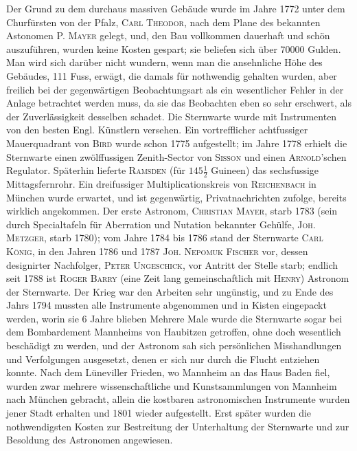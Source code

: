 Der Grund zu dem durchaus massiven Gebäude wurde im Jahre 1772 unter dem Churfürsten von der Pfalz, \textsc{Carl Theodor}, nach dem Plane des bekannten Astonomen P. \textsc{Mayer} gelegt, und, den Bau vollkommen dauerhaft und schön auszuführen, wurden keine Kosten gespart; sie beliefen sich über 70000 Gulden. Man wird sich darüber nicht wundern, wenn man die ansehnliche Höhe des Gebäudes, 111 Fuss, erwägt, die damals für nothwendig gehalten wurden, aber freilich bei der gegenwärtigen Beobachtungsart als ein wesentlicher Fehler in der Anlage betrachtet werden muss, da sie das Beobachten eben so sehr erschwert, als der Zuverlässigkeit desselben schadet. Die Sternwarte wurde mit Instrumenten von den besten Engl. Künstlern versehen. Ein vortrefflicher achtfussiger Mauerquadrant von \textsc{Bird} wurde schon 1775 aufgestellt; im Jahre 1778 erhielt die Sternwarte einen zwölffussigen Zenith-Sector von \textsc{Sisson} und einen \textsc{Arnold}'schen Regulator. Späterhin lieferte \textsc{Ramsden} (für $145\tfrac{1}{2}$ Guineen) das sechsfussige Mittagsfernrohr. Ein dreifussiger Multiplicationskreis von \textsc{Reichenbach} in München wurde erwartet, und ist gegenwärtig, Privatnachrichten zufolge, bereits wirklich angekommen. Der erste Astronom, \textsc{Christian Mayer}, starb 1783 (sein durch Specialtafeln für Aberration und Nutation bekannter Gehülfe, \textsc{Joh. Metzger}, starb 1780); vom Jahre 1784 bis 1786 stand der Sternwarte \textsc{Carl König}, in den Jahren 1786 und 1787 \textsc{Joh. Nepomuk Fischer} vor, dessen designirter Nachfolger, \textsc{Peter Ungeschick}, vor Antritt der Stelle starb; endlich seit 1788 ist \textsc{Roger Barry} (eine Zeit lang gemeinschaftlich mit \textsc{Henry}) Astronom der Sternwarte. Der Krieg war den Arbeiten sehr ungünstig, und zu Ende des Jahrs 1794 mussten alle Instrumente abgenommen und in Kisten eingepackt werden, worin sie 6 Jahre blieben Mehrere Male wurde die Sternwarte sogar bei dem Bombardement Mannheims von Haubitzen getroffen, ohne doch wesentlich beschädigt zu werden, und der Astronom sah sich persönlichen Misshandlungen und Verfolgungen ausgesetzt, denen er sich nur durch die Flucht entziehen konnte. Nach dem Lüneviller Frieden, wo Mannheim an das Haus Baden fiel, wurden zwar mehrere wissenschaftliche und Kunstsammlungen von Mannheim nach München gebracht, allein die kostbaren astronomischen Instrumente wurden jener Stadt erhalten und 1801 wieder aufgestellt. Erst später wurden die nothwendigsten Kosten zur Bestreitung der Unterhaltung der Sternwarte und zur Besoldung des Astronomen angewiesen.

